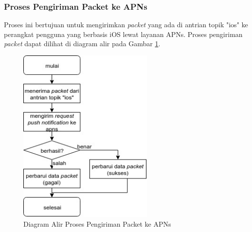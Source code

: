 \subsubsection{Proses Pengiriman Packet ke APNs}
\par Proses ini bertujuan untuk mengirimkan \textit{packet} yang ada di antrian topik "ios" ke perangkat pengguna yang berbasis iOS lewat layanan APNs. Proses pengiriman \textit{packet} dapat dilihat di diagram alir pada
Gambar \ref{flowchart_pengiriman_packet_ke_apns}.
\begin{figure}[H]
    \centering\includegraphics[width=0.6\textwidth]{bab3/img/flowchart-pengiriman_packet_ke_apns.jpg}
    \caption{Diagram Alir Proses Pengiriman Packet ke APNs} \label{flowchart_pengiriman_packet_ke_apns}
\end{figure}
\clearpage

